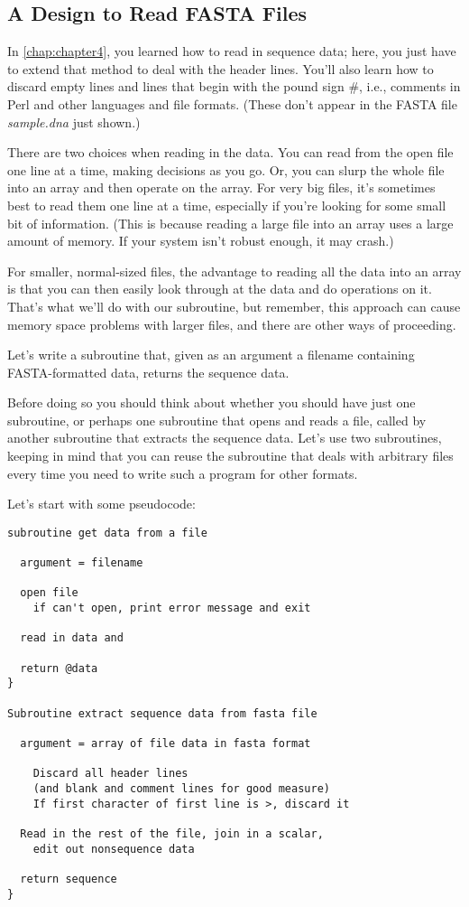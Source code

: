 \subsection{A Design to Read FASTA Files}
In \autoref{chap:chapter4}, you learned how to read in sequence data; here, you just have to extend that method to deal with the header lines.  You'll also learn how to discard empty lines and lines that begin with the pound sign \#, i.e., comments in Perl and other languages and file formats. (These don't appear in the FASTA file \textit{sample.dna} just shown.)

There are two choices when reading in the data. You can read from the open file one line at a time, making decisions as you go. Or, you can slurp the whole file into an array and then operate on the array. For very big files, it's sometimes best to read them one line at a time, especially if you're looking for some small bit of information. (This is because reading a large file into an array uses a large amount of memory. If your system isn't robust enough, it may crash.)

For smaller, normal-sized files, the advantage to reading all the data into an array is that you can then easily look through at the data and do operations on it. That's what we'll do with our subroutine, but remember, this approach can cause memory space problems with larger files, and there are other ways of proceeding.

Let's write a subroutine that, given as an argument a filename containing FASTA-formatted data, returns the sequence data.

Before doing so you should think about whether you should have just one subroutine, or perhaps one subroutine that opens and reads a file, called by another subroutine that extracts the sequence data. Let's use two subroutines, keeping in mind that you can reuse the subroutine that deals with arbitrary files every time you need to write such a program for other formats.

Let's start with some pseudocode:

\begin{lstlisting}
subroutine get data from a file

  argument = filename

  open file
    if can't open, print error message and exit

  read in data and 

  return @data
}

Subroutine extract sequence data from fasta file

  argument = array of file data in fasta format

    Discard all header lines
    (and blank and comment lines for good measure)
    If first character of first line is >, discard it

  Read in the rest of the file, join in a scalar,
    edit out nonsequence data

  return sequence
}
\end{lstlisting}

